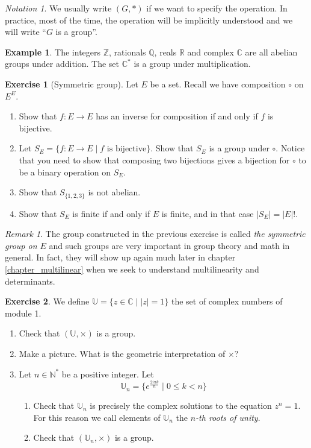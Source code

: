 \documentclass{book}
\newcommand{\N}{\mathbb{N}}
\newcommand{\Z}{\mathbb{Z}}
\newcommand{\Q}{\mathbb{Q}}
\newcommand{\R}{\mathbb{R}}
\newcommand{\C}{\mathbb{C}}
\newcommand{\U}{\mathbb{U}}
\theoremstyle{plain}
\theoremstyle{definition}
\newtheorem{example}[theorem]{Example}
\newtheorem{exercise}{Exercise}[section]
\theoremstyle{remark}
\newtheorem*{remark}{Remark}
\newtheorem*{notation}{Notation}
\begin{document}
\begin{notation}
    We usually write $(G,*)$ if we want to specify the operation. In practice, most of the time, the operation will be implicitly understood and we will write ``$G$ is a group''.
\end{notation}

\begin{example}
    The integers $\Z$, rationals $\Q$, reals $\R$ and complex $\C$ are all abelian groups under addition. The set $\C^*$ is a group under multiplication.
\end{example}

\begin{exercise}[Symmetric group] \label{exo_symmetricgroup}
    Let $E$ be a set. Recall we have composition $\circ$ on $E^E$.
    \begin{enumerate}
        \item Show that $f : E \to E$ has an inverse for composition if and only if $f$ is bijective.
        \item Let $S_E = \{f : E \to E\mid f \text{ is bijective}\}$. Show that $S_E$ is a group under $\circ$. Notice that you need to show that composing two bijections gives a bijection for $\circ$ to be a binary operation on $S_E$.
        \item Show that $S_{\{1,2,3\}}$ is not abelian.
        \item Show that $S_E$ is finite if and only if $E$ is finite, and in that case $|S_E| = |E|!$.
    \end{enumerate}
\end{exercise}

\begin{remark}
    The group constructed in the previous exercise is called \emph{the symmetric group on $E$} and such groups are very important in group theory and math in general. In fact, they will show up again much later in chapter \hyperref[chapter_multilinear]{\ref{chapter_multilinear}} when we seek to understand multilinearity and determinants.
\end{remark}

\begin{exercise}
    We define $\U = \{z \in \C \mid |z| = 1\}$ the set of complex numbers of module 1.
    \begin{enumerate}
        \item Check that $(\U,\times)$ is a group.
        \item Make a picture. What is the geometric interpretation of $\times$?
        \item Let $n \in \N^*$ be a positive integer. Let
        \[\U_n = \{e^\frac{2i \pi k}{n} \mid 0 \le k < n\}\]
        \begin{enumerate}
            \item Check that $\U_n$ is precisely the complex solutions to the equation $z^n = 1$. For this reason we call elements of $\U_n$ the \emph{$n$-th roots of unity}.
            \item Check that $(\U_n, \times)$ is a group.
        \end{enumerate}
    \end{enumerate}
\end{exercise}
\end{document}
